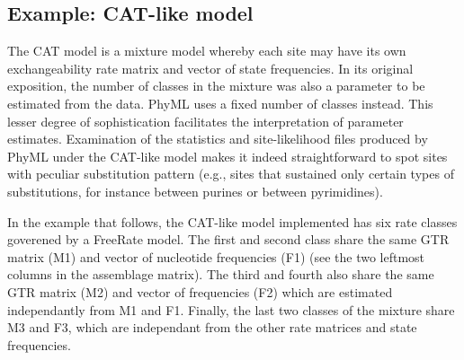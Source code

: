 \documentclass[a4paper,12pt]{article}
\begin{document}
\subsection{Example: CAT-like model}

The CAT model \cite{lartillot04} is a mixture model whereby each site may have its own
exchangeability rate matrix and vector of state frequencies. In its original exposition, the number
of classes in the mixture was also a parameter to be estimated from the data. PhyML uses a fixed
number of classes instead. This lesser degree of sophistication facilitates the interpretation
of parameter estimates. Examination of the statistics and site-likelihood files produced by PhyML
under the CAT-like model makes it indeed straightforward to spot sites with peculiar substitution
pattern (e.g., sites that sustained only certain types of substitutions, for instance between
purines or between pyrimidines).

In the  example that follows,  the CAT-like model  implemented has six  rate classes goverened  by a
FreeRate model. The first  and second class share the same GTR matrix  (M1) and vector of nucleotide
frequencies (F1) (see the two leftmost columns in  the assemblage matrix). The third and fourth also
share the same GTR matrix (M2) and vector of frequencies (F2) which are estimated independantly from
M1 and F1. Finally, the last two classes of  the mixture share M3 and F3, which are independant from
the other rate matrices and state frequencies.
\end{document}
